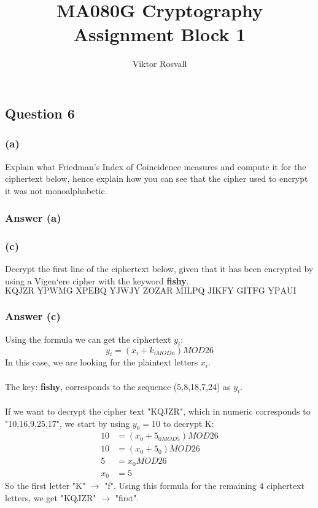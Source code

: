 \documentclass{article}
\title{MA080G Cryptography Assignment Block 1}
\author{Viktor Rosvall}
\begin{document}
	\maketitle
	
	\subsection*{Question 6}
	\subsubsection*{(a)}
	Explain what Friedman’s Index of Coincidence measures and compute it for the
	ciphertext below, hence explain how you can see that the cipher used to encrypt
	it was not monoalphabetic.
	
	\subsubsection*{Answer (a)}
	
	
	\subsubsection*{(c)}
	Decrypt the first line of the ciphertext below, given that it has been encrypted by
	using a Vigen`ere cipher with the keyword \textbf{fishy}.
	$$
	\text{KQJZR YPWMG XPEBQ YJWJY ZOZAR MILPQ JIKFY GITFG YPAUI HWMSB MINLA FCYOR}
	$$
	
	\subsubsection*{Answer (c)}
	Using the formula we can get the ciphertext $y_i$:
	$$
	y_i = (x_i + k_{i MOD n}) MOD 26
	$$
	In this case, we are looking for the plaintext letters $x_i$.
	\\\\
	The key: \textbf{fishy}, corresponds to the sequence (5,8,18,7,24) as $y_i$. 
	\\\\
	If we want to decrypt the cipher text "KQJZR", which in numeric corresponds to "10,16,9,25,17", we start by using $y_0 = 10$ to decrypt K:
	\[
	\begin{split}
	10 	&= (x_0 + 5_{0 MOD 5}) MOD 26 \\
	10	&= (x_0 + 5_0) MOD 26 \\
	5	&= x_0 MOD 26 \\
	x_0 &= 5
	\end{split}
	\]
	So the first letter "K" $\rightarrow$ "f". Using this formula for the remaining 4 ciphertext letters, we get "KQJZR" $\rightarrow$ "first".
	
	
\end{document}
